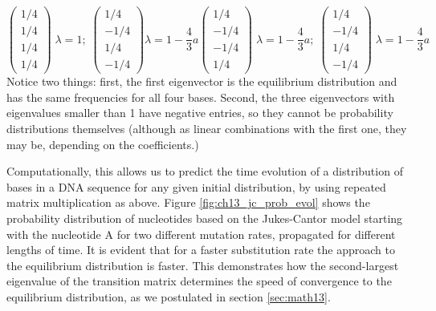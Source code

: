 \documentclass[
  letterpaper,
  DIV=11,
  numbers=noendperiod]{scrreprt}
\begin{document}
\[  \left(\begin{array}{c} 1/4 \\ 1/4 \\ 1/4 \\ 1/4 \end{array}\right) \; \lambda =1; \; \left(\begin{array}{c} 1/4 \\ -1/4 \\ 1/4 \\ -1/4 \end{array}\right) \lambda =1-\frac{4}{3}a  
\left(\begin{array}{c} 1/4 \\ -1/4 \\ -1/4 \\ 1/4 \end{array}\right) \; \lambda =1-\frac{4}{3}a;  \; \left(\begin{array}{c} 1/4 \\ -1/4 \\ 1/4 \\ -1/4 \end{array}\right) \; \lambda =1-\frac{4}{3}a\]
Notice two things: first, the first eigenvector is the equilibrium
distribution and has the same frequencies for all four bases. Second,
the three eigenvectors with eigenvalues smaller than 1 have negative
entries, so they cannot be probability distributions themselves
(although as linear combinations with the first one, they may be,
depending on the coefficients.)

Computationally, this allows us to predict the time evolution of a
distribution of bases in a DNA sequence for any given initial
distribution, by using repeated matrix multiplication as above. Figure
\ref{fig:ch13_jc_prob_evol} shows the probability distribution of
nucleotides based on the Jukes-Cantor model starting with the nucleotide
A for two different mutation rates, propagated for different lengths of
time. It is evident that for a faster substitution rate the approach to
the equilibrium distribution is faster. This demonstrates how the
second-largest eigenvalue of the transition matrix determines the speed
of convergence to the equilibrium distribution, as we postulated in
section \ref{sec:math13}.
\end{document}
